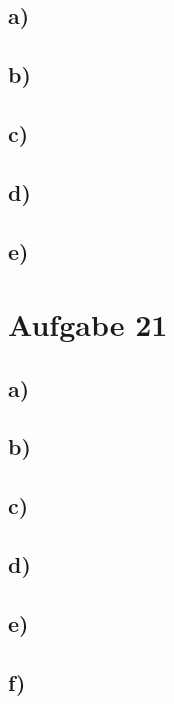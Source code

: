 \subsection{a)}

\subsection{b)}

\subsection{c)}

\subsection{d)}

\subsection{e)}

\section{Aufgabe 21}

\subsection{a)}

\subsection{b)}

\subsection{c)}

\subsection{d)}

\subsection{e)}

\subsection{f)}




